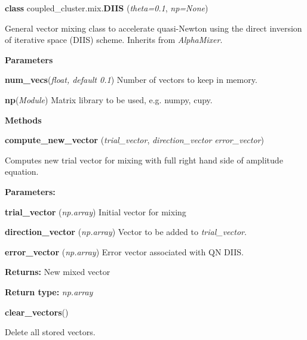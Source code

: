 \begin{tcolorbox}
    {\selectfont
    \textbf{class} coupled\_cluster.mix.\textbf{DIIS}
    (\emph{theta=0.1}, \emph{np=None})

    \vspace{1em}
    General vector mixing class to accelerate quasi-Newton using the 
    direct inversion of iterative space (DIIS) scheme. Inherits from 
    \emph{AlphaMixer}.
        
    \vspace{1em}
    \textbf{Parameters}

    \hspace{2em}\textbf{num\_vecs}(\emph{float, default 0.1}) 
        Number of vectors to keep in memory.

    \hspace{2em}\textbf{np}(\emph{Module})
        Matrix library to be used, e.g. numpy, cupy.

    \vspace{1em} 
    \textbf{Methods}

    \hspace{2em} \textbf{compute\_new\_vector}
        (\emph{trial\_vector}, \emph{direction\_vector} \emph{error\_vector})

        \begin{adjustwidth}{4em}{}
        Computes new trial vector for mixing with full right hand side of amplitude 
        equation.

        \textbf{Parameters:} 

            \hspace{1.5em}\textbf{trial\_vector} (\emph{np.array}) 
            Initial vector for mixing

            \hspace{1.5em}\textbf{direction\_vector} (\emph{np.array})
            Vector to be added to \emph{trial\_vector}.

            \hspace{1.5em}\textbf{error\_vector} (\emph{np.array})
            Error vector associated with QN DIIS. 

        \textbf{Returns:} New mixed vector

        \textbf{Return type:} \emph{np.array}
        \end{adjustwidth}

    \hspace{2em} \textbf{clear\_vectors}()
        \begin{adjustwidth}{4em}{}
        Delete all stored vectors.
        \end{adjustwidth}
    } 
\end{tcolorbox}